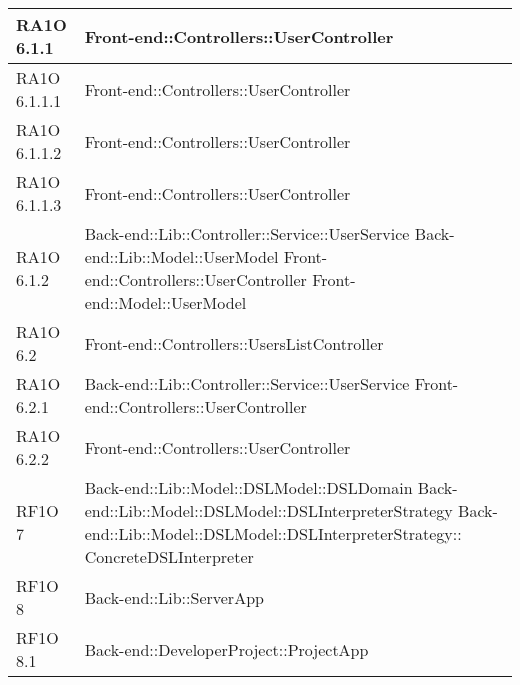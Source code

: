 \begin{center}
\begin{longtable}{ | p{3cm} | p{11cm} | }
    RA1O 6.1.1 & Front-end::Controllers::UserController \newline  \\ \hline     
     
    RA1O 6.1.1.1 & Front-end::Controllers::UserController \newline  \\ \hline
        
    RA1O 6.1.1.2 & Front-end::Controllers::UserController \newline  \\ \hline
        
    RA1O 6.1.1.3 & Front-end::Controllers::UserController \newline  \\ \hline
       
    RA1O 6.1.2 & Back-end::Lib::Controller::Service::UserService \newline Back-end::Lib::Model::UserModel \newline Front-end::Controllers::UserController \newline Front-end::Model::UserModel \newline  \\ \hline     
    
    
    RA1O 6.2 & Front-end::Controllers::UsersListController  \\ \hline     
     
    RA1O 6.2.1 & Back-end::Lib::Controller::Service::UserService \newline Front-end::Controllers::UserController \newline  \\ \hline      
    RA1O 6.2.2 & Front-end::Controllers::UserController \newline  \\ \hline      
      
    RF1O 7 & Back-end::Lib::Model::DSLModel::DSLDomain \newline Back-end::Lib::Model::DSLModel::DSLInterpreterStrategy \newline Back-end::Lib::Model::DSLModel::DSLInterpreterStrategy:: \newline ConcreteDSLInterpreter  \\ \hline      
    
    RF1O 8 & Back-end::Lib::ServerApp \newline  \\ \hline   
       
    RF1O 8.1  & Back-end::DeveloperProject::ProjectApp \newline  \\ \hline  
        

\end{longtable}
\end{center}
